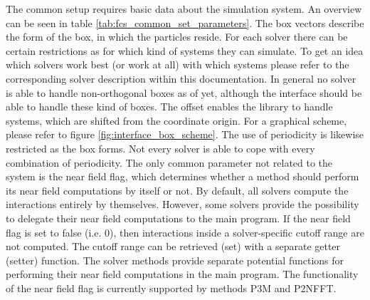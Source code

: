 The common setup requires basic data about the simulation system. An overview can be seen in table \ref{tab:fcs_common_set_parameters}. The box vectors
describe the form of the box, in which the particles reside. For each solver there can be certain restrictions as for which kind of systems they can simulate. 
To get an idea which solvers work best (or work at all) with which systems please refer to the corresponding solver description within this documentation.
In general no solver is able to handle non-orthogonal boxes as of yet, although the interface should be able to handle these kind of boxes. The offset
enables the library to handle systems, which are shifted from the coordinate origin. For a graphical scheme, please refer to figure \ref{fig:interface_box_scheme}.
The use of periodicity is likewise restricted as the box forms. Not every solver is able to cope with every combination of periodicity. The only
common parameter not related to the system is the near field flag, which determines whether a method should perform its near field computations by itself or not.
By default, all solvers compute the interactions entirely by themselves. However, some solvers provide the possibility to delegate their near field 
computations to the main program. If the near field flag is set to false (i.e. 0), then interactions inside a solver-specific cutoff range are not computed.
The cutoff range can be retrieved (set) with a separate getter (setter) function. The solver methods provide separate potential functions for performing their
near field computations in the main program. The functionality of the near field flag is currently supported by methods P3M and P2NFFT.

